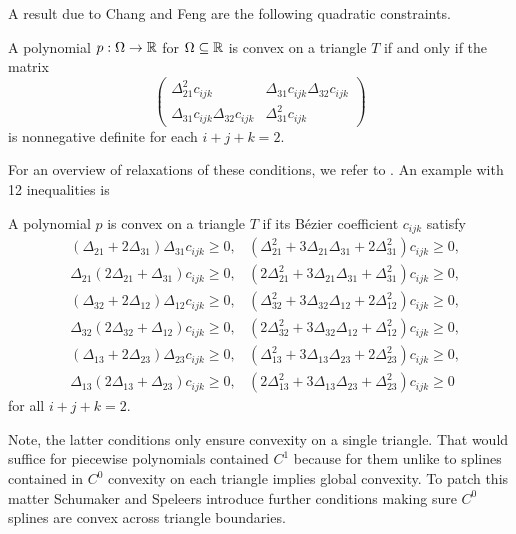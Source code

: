 A result due to Chang and Feng \cite{CD1984} are the following quadratic constraints.
\begin{theorem}[{\cite[p.2]{LS2007}}]
	A polynomial $p:\Omega \rightarrow \mathbb{R}$ for $\Omega \subseteq \mathbb{R}$ is convex on a triangle $T$ if and only if the matrix
	\[
		\begin{pmatrix}
			\Delta_{21}^2 c_{ijk} & \Delta_{31} c_{ijk} \Delta_{32} c_{ijk}\\
			\Delta_{31}c_{ijk} \Delta_{32} c_{ijk} & \Delta_{31}^2 c_{ijk} 
		\end{pmatrix}
	\]
	is nonnegative definite for each $i + j + k =2 $.
\end{theorem}
For an overview of relaxations of these conditions, we refer to \cite{SS2010}. An example with 12 inequalities is 
\begin{theorem}
\label{thm: convex cond on triangle}
	A polynomial $p$ is convex on a triangle $T$ if its B\'ezier coefficient $c_{ijk}$ satisfy
	\begin{align*}
		&(\Delta_{21} + 2\Delta_{31}) \Delta_{31} c_{ijk} \geq 0, 
		&   (\Delta_{21}^2 + 3\Delta_{21} \Delta_{31} + 2 \Delta_{31}^2) c_{ijk} \geq 0, \\
		& \Delta_{21}(2\Delta_{21} + \Delta_{31})  c_{ijk} \geq 0, 
		&   (2\Delta_{21}^2 + 3\Delta_{21} \Delta_{31} +  \Delta_{31}^2) c_{ijk} \geq 0, \\  
		&(\Delta_{32} + 2\Delta_{12}) \Delta_{12} c_{ijk} \geq 0, 
		&   (\Delta_{32}^2 + 3\Delta_{32} \Delta_{12} + 2 \Delta_{12}^2) c_{ijk} \geq 0, \\
		&\Delta_{32} (2\Delta_{32} + \Delta_{12}) c_{ijk} \geq 0, 
		&   (2\Delta_{32}^2 + 3\Delta_{32} \Delta_{12} +  \Delta_{12}^2) c_{ijk} \geq 0, \\  
		&(\Delta_{13} + 2\Delta_{23}) \Delta_{23} c_{ijk} \geq 0, 
		&   (\Delta_{13}^2 + 3\Delta_{13} \Delta_{23} + 2 \Delta_{23}^2) c_{ijk} \geq 0, \\
		& \Delta_{13}(2\Delta_{13} + \Delta_{23})  c_{ijk} \geq 0, 
		&   (2\Delta_{13}^2 + 3\Delta_{13} \Delta_{23} +  \Delta_{23}^2) c_{ijk} \geq 0   
	\end{align*}
	for all $i + j + k =2 $.
\end{theorem}
Note, the latter conditions only ensure convexity on a single triangle. That would suffice for piecewise polynomials contained $C^1$ because for them unlike to splines contained in $C^0$ convexity on each triangle implies global convexity. To patch this matter Schumaker and Speleers introduce further conditions making sure $C^0$ splines are convex across triangle boundaries.

